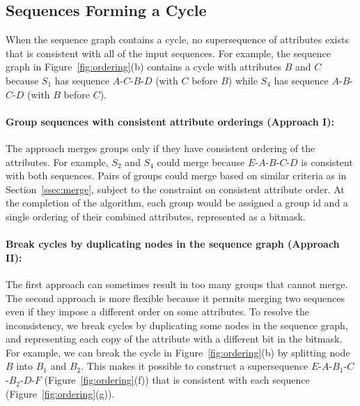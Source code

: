 \subsection{Sequences Forming a Cycle}
\label{ss:breakcycle}
When the sequence graph contains a cycle, no supersequence of attributes exists that is consistent with all of the input sequences.  For example, the sequence graph in Figure~\ref{fig:ordering}(b) contains a cycle with attributes $B$ and $C$ because $S_1$ has sequence $A$-$C$-$B$-$D$ (with $C$ before $B$) while $S_4$ has sequence $A$-$B$-$C$-$D$ (with $B$ before $C$).

\paragraph{Group sequences with consistent attribute orderings (Approach I):} The approach merges groups only if they have consistent ordering of the attributes.  For example, $S_2$ and $S_4$ could merge because $E$-$A$-$B$-$C$-$D$ is consistent with both sequences.  Pairs of groups could merge based on similar
criteria as in Section~\ref{ssec:merge}, subject to the constraint on consistent attribute order.  At the completion
of the algorithm, each group would be assigned a group id and a single ordering of their combined attributes, represented as a bitmask.

\paragraph{Break cycles by duplicating nodes in the sequence graph
  (Approach II):} The first approach can sometimes result in too many
groups that cannot merge. The second approach is more flexible because
it permits merging two sequences even if they impose a different
order on some attributes.  To resolve the inconsistency, we break cycles
by duplicating some nodes in the sequence graph, and representing
each copy of the attribute with a different bit in the bitmask.  For
example, we can break the cycle in Figure~\ref{fig:ordering}(b) by
splitting node $B$ into $B_1$ and $B_2$.  This makes it possible to
construct a supersequence $E$-$A$-$B_1$-$C$-$B_2$-$D$-$F$
(Figure~\ref{fig:ordering}(f)) that is consistent with each sequence
(Figure~\ref{fig:ordering}(g)). 


